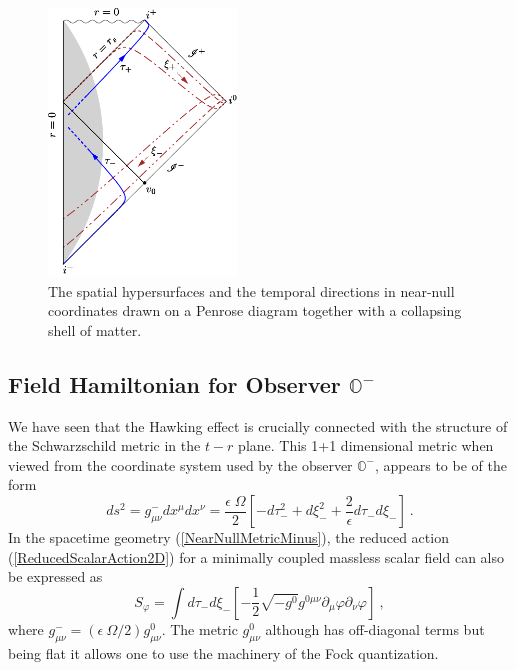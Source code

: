 \documentclass[aps,twocolumn,showpacs]{revtex4}
\def\observerminus{\mathbb{O}^{-}}
\begin{document}

\begin{figure}
\includegraphics[width=5cm]{near-null-collapse.pdf}
\caption{The spatial hypersurfaces and the temporal directions in near-null 
coordinates drawn on a Penrose diagram together with a collapsing shell of 
matter. 
}
\label{fig:NearNullMinusPenrose} 
\end{figure}





\subsection{Field Hamiltonian for Observer $\observerminus$}


We have seen that the Hawking effect is crucially connected with 
the structure of the Schwarzschild metric in the $t-r$ plane. This 
1+1 dimensional metric when viewed from the coordinate system used by
the observer $\observerminus$, appears to be of the form
%
\begin{equation}\label{NearNullMetricMinus}
ds^2 = g^{-}_{\mu\nu}dx^{\mu}dx^{\nu} = \frac{\epsilon\; \Omega}{2}
\left[ -  d\tau_{-}^2 + d\xi_{-}^2 
+\frac{2}{\epsilon} d\tau_{-} d\xi_{-} \right]  ~. 
\end{equation}
%
In the spacetime geometry (\ref{NearNullMetricMinus}), the reduced action 
(\ref{ReducedScalarAction2D}) for a minimally coupled massless scalar field  can 
also be expressed as
%
\begin{equation}\label{ReducedScalarAction2DFlat}
S_{\varphi} =  \int d\tau_{-}  d\xi_{-} \left[-\frac{1}{2} \sqrt{-g^{0}} 
g^{0\mu\nu} \partial_{\mu}\varphi \partial_{\nu} \varphi \right]  ~,
\end{equation}
%
where $g^{-}_{\mu\nu} = (\epsilon ~\Omega/2) g^{0}_{\mu\nu}$. The metric 
$g^{0}_{\mu\nu}$ although has off-diagonal terms but being flat it allows 
one to use the machinery of the Fock quantization. 
\end{document}
